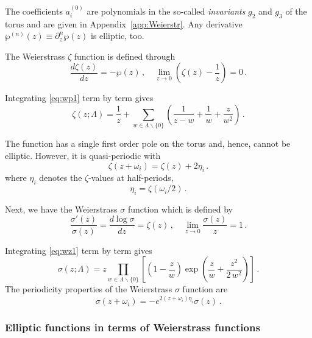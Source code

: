 \documentclass[11pt,a4paper]{article}
\numberwithin{equation}{section}
\begin{document}
\noindent 
The coefficients $a_i^{(0)}$ are polynomials in the so-called \textit{invariants} $g_2$ and $g_3$ of the torus and are given in Appendix~\ref{app:Weierstr}. 
Any derivative $\wp^{(n)}(z) \equiv \partial_z^n \wp(z)$ is elliptic, too. 

The Weierstrass $\zeta$ function is defined through
%
\begin{equation}\label{eq:zeta-def}
    \frac{d \zeta(z)}{dz} = -\wp(z)\,, \quad \lim_{z\to0}\left(\zeta(z)-\frac{1}{z}\right) =0\,.
\end{equation}

\noindent 
Integrating \eqref{eq:wp1} term by term gives
%
\begin{equation}\label{eq:wz1}
    \zeta(z;\Lambda) = \frac{1}{z} + \sum_{w\in \Lambda\backslash\{0\}} \left(\frac{1}{z-w} +\frac{1}{w} + \frac{z}{w^2}\right)\,.
\end{equation}

\noindent
The function has a single first order pole on the torus and, hence, cannot be elliptic. However, it is quasi-periodic with
%
\begin{equation}\label{eq:ZetaPeriod}
    \zeta(z+\omega_i) = \zeta(z) + 
    2 \eta_i \,.
\end{equation}
%
where $\eta_i$ denotes the $\zeta$-values at half-periods,
%
\begin{equation}\label{eq:eta-i-def}
    \eta_i = \zeta(\omega_i/2) \,.
\end{equation}

\noindent
Next, we have the Weierstrass $\sigma$ function which is defined by
%
\begin{equation}
    \frac{\sigma'(z)}{\sigma(z)} = \frac{d \log\sigma}{dz} = \zeta(z)\,,\quad 
    \lim_{z\to0} \frac{\sigma(z)}{z} =1\,.
\end{equation}

\noindent
Integrating \eqref{eq:wz1} term by term gives
%
\begin{equation}
    \sigma(z;\Lambda) = z\prod_{w\in\Lambda\backslash\{0\}} \left[ \left(1-\frac{z}{w}\right) \exp\!\left(\frac{z}{w}+\frac{z^2}{2\,w^2}\right) \right]\,.
\end{equation}
The periodicity properties of the Weierstrass $\sigma$ function are
%
\begin{equation}\label{eq:sigmaPeriod}
    \sigma(z+\omega_i) = -e^{2 (z+\omega_i) \eta_i } \sigma(z)\,.
\end{equation}

\subsubsection{Elliptic functions in terms of Weierstrass functions}
\end{document}
